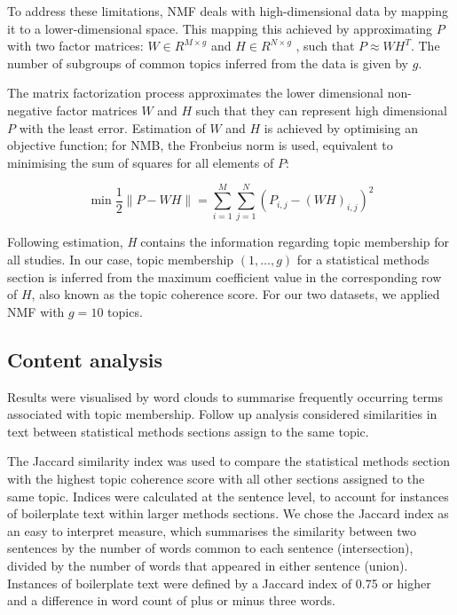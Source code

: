 \documentclass[12pt]{article}
\begin{document}
To address these limitations, NMF deals with high-dimensional data by
mapping it to a lower-dimensional space. This mapping this achieved by
approximating \(P\) with two factor matrices: \(W \in R^{M \times g}\)
and \(H \in R ^{N \times g}\) \citep{aggarwal2012mining}, such that
\(P \approx WH^{T}\). The number of subgroups of common topics inferred
from the data is given by \(g\).

The matrix factorization process approximates the lower dimensional
non-negative factor matrices \(W\) and \(H\) such that they can
represent high dimensional \(P\) with the least error. Estimation of
\(W\) and \(H\) is achieved by optimising an objective function; for
NMB, the Fronbeius norm is used, equivalent to minimising the sum of
squares for all elements of \(P\):

\begin{equation}
\label{eq:NMFobjectivefn}
\min \frac{1}{2}\|P - WH\|= \sum _{i=1}^{M}\sum _{j=1}^{N} \left(  P_{i,j} -\left(WH \right)_{i,j} \right)^{2}
\end{equation}

Following estimation, \textit{H} contains the information regarding
topic membership for all studies. In our case, topic membership
\((1,\ldots,g)\) for a statistical methods section is inferred from the
maximum coefficient value in the corresponding row of \(H\), also known
as the topic coherence score. For our two datasets, we applied NMF with
\(g=10\) topics.

\subsection{Content analysis}

Results were visualised by word clouds to summarise
frequently occurring terms associated with topic membership. Follow up analysis considered 
similarities in text between statistical methods sections assign to the same topic.

The Jaccard similarity index was used to compare the statistical methods
section with the highest topic coherence score with all other sections
assigned to the same topic. Indices were calculated at the sentence
level, to account for instances of boilerplate text within larger
methods sections. We chose the Jaccard index as an easy to interpret
measure, which summarises the similarity between two sentences by the
number of words common to each sentence (intersection), divided by the
number of words that appeared in either sentence (union). Instances of
boilerplate text were defined by a Jaccard index of 0.75 or higher and a
difference in word count of plus or minus three words.
\end{document}
